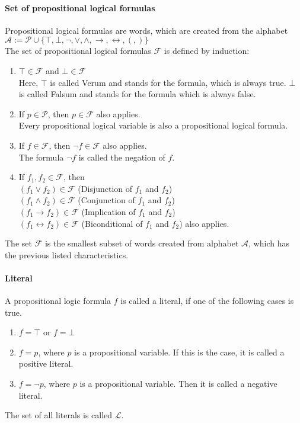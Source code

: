 \paragraph{Set of propositional logical formulas}
Propositional logical formulas are words, which are created from the alphabet $\mathcal{A}:= \mathcal{P} \cup \{\top,\bot,\neg,\vee,\land,\rightarrow,\leftrightarrow,(,)\}$ \\
The set of propositional logical formulas $\mathcal{F}$ is defined by induction: 
\begin{enumerate}
  \item $\top \in \mathcal{F}$ and $\bot \in \mathcal{F}$ \\
  Here, $\top$ is called Verum and stands for the formula, which is always true. $\bot$ is called Falsum and stands for the formula which is always false.
  \item If $p \in \mathcal{P}$, then $p \in \mathcal{F}$ also applies. \\
  Every propositional logical variable is also a propositional logical formula.
  \item If $f \in \mathcal{F}$, then $\neg f \in \mathcal{F}$ also applies. \\
  The formula $\neg f$ is called the negation of $f$.
  \item If $f_1, f_2 \in \mathcal{F}$, then \\
  $(f_1 \vee f_2) \in \mathcal{F}$ (Disjunction of $f_1$ and $f_2$) \\
  $(f_1 \land f_2) \in \mathcal{F}$ (Conjunction of $f_1$ and $f_2$) \\
  $(f_1 \rightarrow f_2) \in \mathcal{F}$ (Implication of $f_1$ and $f_2$) \\
  $(f_1 \leftrightarrow f_2) \in \mathcal{F}$ (Biconditional of $f_1$ and $f_2$)
  also applies.
\end{enumerate}
The set $\mathcal{F}$ is the smallest subset of words created from alphabet $\mathcal{A}$, which has the previous listed characteristics.

\paragraph{Literal}
A propositional logic formula $f$ is called a literal, if one of the following cases is true.
\begin{enumerate}
  \item $f = \top$ or $f = \bot$
  \item $f = p$, where $p$ is a propositional variable. If this is the case, it is called a positive literal.
  \item $f = \neg p$, where $p$ is a propositional variable. Then it is called a negative literal.
\end{enumerate}
The set of all literals is called $\mathcal{L}$.


